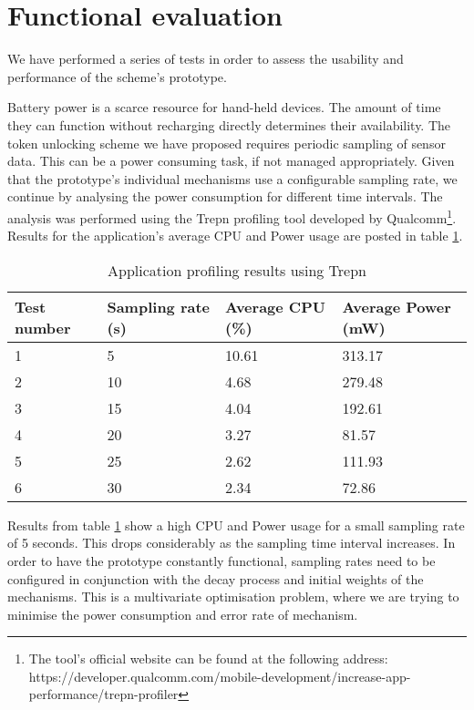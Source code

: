 \section{Functional evaluation}
\label{functionaleval}
We have performed a series of tests in order to assess the usability and performance of the scheme's prototype. 

Battery power is a scarce resource for hand-held devices. The amount of time they can function without recharging directly determines their availability. The token unlocking scheme we have proposed requires periodic sampling of sensor data. This can be a power consuming task, if not managed appropriately. Given that the prototype's individual mechanisms use a configurable sampling rate, we continue by analysing the power consumption for different time intervals. The analysis was performed using the Trepn profiling tool developed by Qualcomm\footnote{The tool's official website can be found at the following address: https://developer.qualcomm.com/mobile-development/increase-app-performance/trepn-profiler}. Results for the application's average CPU and Power usage are posted in table \ref{tab:powerprofile}.

\begin{table}
    \begin{tabular}{l|l|l|l}
    Test number & Sampling rate (s) & Average CPU (\%) & Average Power (mW) \\ \hline
    1           & 5                 & 10.61            & 313.17             \\
    2           & 10                & 4.68             & 279.48             \\
    3           & 15                & 4.04             & 192.61             \\
    4           & 20                & 3.27             & 81.57              \\
    5           & 25                & 2.62             & 111.93             \\
    6           & 30                & 2.34             & 72.86              \\
    \end{tabular}
	
	\caption{Application profiling results using Trepn}
	\label{tab:powerprofile}
\end{table}

Results from table \ref{tab:powerprofile} show a high CPU and Power usage for a small sampling rate of 5 seconds. This drops considerably as the sampling time interval increases. In order to have the prototype constantly functional, sampling rates need to be configured in conjunction with the decay process and initial weights of the mechanisms. This is a multivariate optimisation problem, where we are trying to minimise the power consumption and error rate of mechanism.

